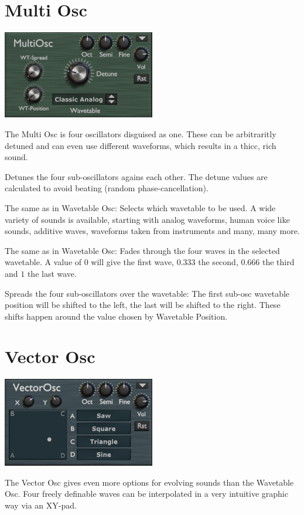 \section{Multi Osc}
\begin{center}
    \includegraphics[width=0.5\textwidth]{graphics/multi_osc.png}
\end{center}
The Multi Osc is four oscillators disguised as one. These can be arbitraritly detuned and can even use different waveforms, which results in a thicc, rich sound.

{Detunes the four sub-oscillators agains each other. The detune values are calculated to avoid beating (random phase-cancellation).}

{The same as in Wavetable Osc: Selects which wavetable to be used. A wide variety of sounds is available, starting with analog waveforms, human voice like sounds, additive waves, waveforms taken from instruments and many, many more.}

{The same as in Wavetable Osc: Fades through the four waves in the selected wavetable. A value of $0$ will give the first wave, $0.333$ the second, $0.666$ the third and $1$ the last wave.}

{Spreads the four sub-oscillators over the wavetable: The first sub-osc wavetable position will be shifted to the left, the last will be shifted to the right. These shifts happen around the value chosen by Wavetable Position.}

\section{Vector Osc}
\begin{center}
    \includegraphics[width=0.5\textwidth]{graphics/vector_osc.png}
\end{center}
The Vector Osc gives even more options for evolving sounds than the Wavetable Osc. Four freely definable waves can be interpolated in a very intuitive graphic way via an XY-pad.

